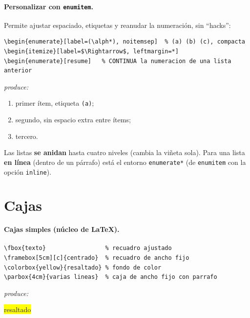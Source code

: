 \documentclass[11pt,a4paper]{article}
\newcommand{\produce}{\par\smallskip\noindent\textit{produce:}\par\smallskip}
\begin{document}
\paragraph{Personalizar con \texttt{enumitem}.} Permite ajustar espaciado,
etiquetas y reanudar la numeración, sin \enquote{hacks}:
\begin{lstlisting}
\begin{enumerate}[label=(\alph*), noitemsep]  % (a) (b) (c), compacta
\begin{itemize}[label=$\Rightarrow$, leftmargin=*]
\begin{enumerate}[resume]   % CONTINUA la numeracion de una lista anterior
\end{lstlisting}
\produce
\begin{center}\begin{minipage}{0.7\linewidth}
\begin{enumerate}[label=(\alph*), noitemsep]
  \item primer ítem, etiqueta \texttt{(a)};
  \item segundo, sin espacio extra entre ítems;
  \item tercero.
\end{enumerate}
\end{minipage}\end{center}
Las listas \textbf{se anidan} hasta cuatro niveles (cambia la viñeta sola). Para
una lista \textbf{en línea} (dentro de un párrafo) está el entorno \texttt{enumerate*}
(de \texttt{enumitem} con la opción \texttt{inline}).

\section{Cajas}
\paragraph{Cajas simples (núcleo de \LaTeX).}
\begin{lstlisting}
\fbox{texto}                 % recuadro ajustado
\framebox[5cm][c]{centrado}  % recuadro de ancho fijo
\colorbox{yellow}{resaltado} % fondo de color
\parbox{4cm}{varias lineas}  % caja de ancho fijo con parrafo
\end{lstlisting}
\produce
\begin{center}
 \quad \colorbox{yellow}{resaltado} \quad
{}
\end{center}
\end{document}
